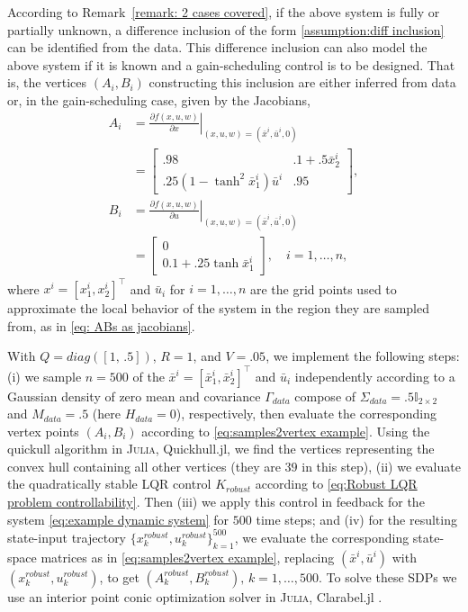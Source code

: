 \documentclass[letterpaper, 10 pt, conference]{ieeeconf}
\begin{document}
According to Remark~\ref{remark: 2 cases covered}, if the above system is fully or partially unknown, a difference inclusion of the form \eqref{assumption:diff inclusion} can be identified from the data. This difference inclusion can also model the above system if it is known and a gain-scheduling control is to be designed. That is, the vertices $(A_i, B_i)$ constructing this inclusion are either inferred from data or, in the gain-scheduling case, given by the Jacobians,
\begin{equation}\label{eq:samples2vertex example}
\begin{aligned} 
    A_i &= \left. \frac{\partial f (x, u,w)}{\partial x} \right |_{(x,u,w)=(\bar x^i, \bar u^i, 0)} \\
    &= 
    \begin{bmatrix}
        .98& .1+.5 \bar x_{2}^i\\
        .25 (1-\tanh^2{\bar x_{1}^i})\bar u^i& .95
    \end{bmatrix}, \\
    B_i &= \left. \frac{\partial f (x, u,w)}{\partial u} \right |_{(x,u,w)=(\bar x^i, \bar u^i, 0)} \\
    &=
    \begin{bmatrix}
        0\\
        0.1 + .25 \tanh{\bar x_{1}^i}
    \end{bmatrix},\quad i=1,\hdots,n,
\end{aligned}
\end{equation}
where $x^i=[x_1^i, x_2^i]^\top$ and $\bar u_i$ for $i=1,\hdots,n$ are the grid points used to approximate the local behavior of the system in the region they are sampled from, as in \eqref{eq: ABs as jacobians}. 

With $Q=diag([1,\,.5])$, $R=1$, and $V=.05$, we implement the following steps: (i) we sample $n=500$ of the $\bar x^i=[\bar x_1^i, \bar x_2^i]^\top$ and $\bar u_i$ independently according to a Gaussian density of zero mean and covariance $\Gamma_{data}$ compose of $\Sigma_{data}=.5\mathbb I_{2 \times 2}$ and $M_{data}=.5$ (here $H_{data}=0$), respectively, then evaluate the corresponding vertex points $(A_i, B_i)$ according to \eqref{eq:samples2vertex example}. Using the quickull algorithm \cite{barber1996quickhull} in \textsc{Julia}, Quickhull.jl, we find the vertices representing the convex hull containing all other vertices (they are $39$ in this step), (ii) we evaluate the quadratically stable LQR control $K_{robust}$ according to \eqref{eq:Robust LQR problem controllability}. Then (iii) we apply this control in feedback for the system \eqref{eq:example dynamic system} for $500$ time steps; and (iv) for the resulting state-input trajectory $\{x_k^{robust},u_k^{robust}\}_{k=1}^{500}$, we evaluate the corresponding state-space matrices as in \eqref{eq:samples2vertex example}, replacing $(\bar x^i,\bar u^i)$ with $(x_k^{robust},u_k^{robust})$, to get $(A_k^{robust},B_k^{robust}),\,k=1,\hdots,500$. To solve these SDPs we use an interior point conic optimization solver in \textsc{Julia}, Clarabel.jl \cite{Clarabel_2024}.
\end{document}
